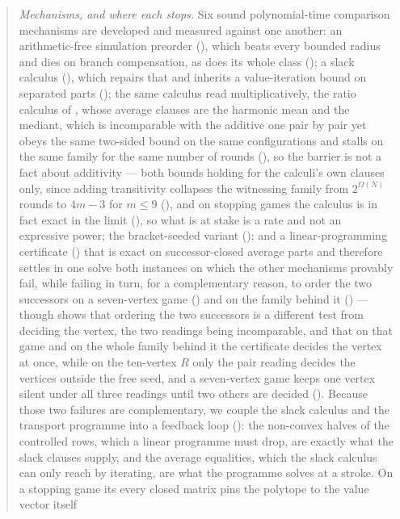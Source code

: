 \documentclass[11pt]{article}
\theoremstyle{plain}
\theoremstyle{definition}
\begin{document}
\begin{abstract}
\emph{Mechanisms, and where each stops.} Six sound polynomial-time
comparison mechanisms are developed and measured against one another: an
arithmetic-free simulation preorder (), which beats
every bounded radius and dies on branch compensation, as does its whole
class (); a slack calculus
(), which repairs that and inherits a value-iteration
bound on separated parts (); the same calculus
read multiplicatively, the ratio calculus of , whose
average clauses are the harmonic mean and the mediant, which is
incomparable with the additive one pair by pair yet obeys the same
two-sided bound on the same configurations and stalls on the same family
for the same number of rounds
(), so
the barrier is not a fact about additivity --- both bounds holding for the
calculi's own clauses only, since adding transitivity collapses the
witnessing family from $2^{\Omega(N)}$ rounds to $4m-3$ for $m\le9$
(), and on stopping games the calculus is in fact
exact in the limit (), so what is at stake is a
rate and not an expressive power; the bracket-seeded variant (); and a
linear-programming certificate () that is exact on
successor-closed average parts and therefore settles in one solve both
instances on which the other mechanisms provably fail, while failing in turn,
for a complementary reason, to order the two successors on a seven-vertex game
() and on the family behind it
() --- though  shows that
ordering the two successors is a different test from deciding the vertex,
the two readings being incomparable, and that on that game and on the
whole family behind it the certificate decides the vertex at once, while
on the ten-vertex $R$ only the pair reading decides the vertices outside
the free seed, and a seven-vertex game keeps one vertex silent under all
three readings until two others are decided (). Because those two failures are
complementary, we couple the slack calculus and the transport programme into a feedback loop
(): the non-convex halves of the controlled rows, which
a linear programme must drop, are exactly what the slack clauses supply,
and the average equalities, which the slack calculus can only reach by
iterating, are what the programme solves at a stroke. On a stopping game
its every closed matrix pins the polytope to the value vector itself

\end{abstract}
\end{document}
